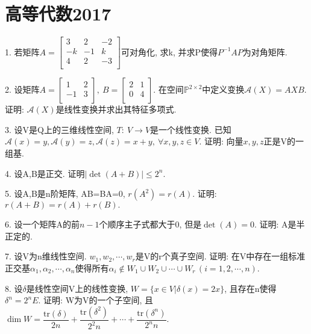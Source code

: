 \documentclass[12pt, a4paper, twoside]{ctexart}%
\begin{document}
	\clearpage
	\section{高等代数2017}
	1. 若矩阵$A=\begin{bmatrix}
		3&2&-2\\
		-k&-1&k\\
		4&2&-3\\
	\end{bmatrix}$可对角化, 求k, 并求P使得$P^{-1}AP$为对角矩阵.\par
	2. 设矩阵$A=\begin{bmatrix}
		1&2\\
		-1&3\\
	\end{bmatrix},\ B=\begin{bmatrix}
	2&1\\
	0&4\\
	\end{bmatrix}$. 在空间$\mathbb{P}^{2\times2}$中定义变换$\mathscr{A}(X)=AXB$. 证明: $\mathscr{A}(X)$是线性变换并求出其特征多项式. \par
	3. 设V是Q上的三维线性空间, $T:\ V\to V$是一个线性变换. 已知$\mathscr{A}(x)=y,\mathscr{A}(y)=z,\mathscr{A}(z)=x+y,\ \forall x,y,z\in V$. 证明: 向量$x,y,z$正是V的一组基.\par 
	4. 设A,B是正交. 证明$|\det(A+B)|\leq 2^n$.\par 
	5. 设A,B是n阶矩阵, AB=BA=0, $r(A^2)=r(A)$. 证明: $r(A+B)=r(A)+r(B).$\par 
	6. 设一个矩阵A的前$n-1$个顺序主子式都大于0, 但是$\det(A)=0$. 证明: A是半正定的.\par
	7. 设V为n维线性空间. $w_1,w_2,\cdots,w_r$是V的r个真子空间. 证明: 在V中存在一组标准正交基$\alpha_1,\alpha_2,\cdots,\alpha_n$使得所有$\alpha_i\notin W_1\cup W_2\cup \cdots\cup W_r\,(i=1,2,\cdots,n)$.\par 
	8. 设$\delta$是线性空间V上的线性变换, $W=\{x\in V\big| \delta(x)=2x\}$, 且存在n使得$\delta^n=2^n E$. 证明: W为V的一个子空间, 且$\dim W=\dfrac{\mathrm{tr}(\delta)}{2n}+\dfrac{\mathrm{tr}(\delta^2)}{2^2n}+\cdots+\dfrac{\mathrm{tr}(\delta^n)}{2^n n}$.\par 
	
	\clearpage
\end{document}
